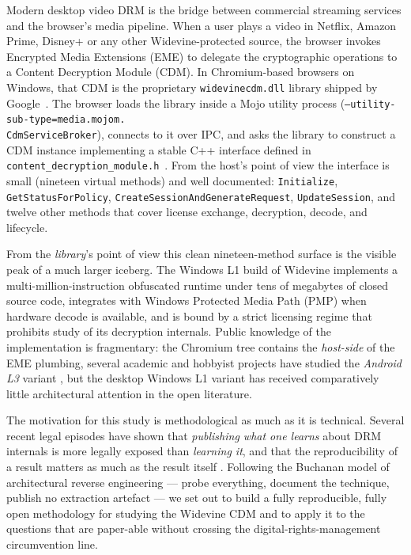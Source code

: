 \documentclass[11pt,letterpaper]{article}
\begin{document}
Modern desktop video DRM is the bridge between commercial streaming
services and the browser's media pipeline. When a user plays a video
in Netflix, Amazon Prime, Disney+ or any other Widevine-protected
source, the browser invokes Encrypted Media Extensions (EME) to
delegate the cryptographic operations to a Content Decryption Module
(CDM). In Chromium-based browsers on Windows, that CDM is the
proprietary \texttt{widevinecdm.dll} library shipped by
Google~\cite{widevine-spec}. The browser loads the library inside a
Mojo utility process
(\texttt{--utility-sub-type=media.mojom.\\CdmServiceBroker}), connects
to it over IPC, and asks the library to construct a CDM instance
implementing a stable C++ interface defined in
\texttt{content\_decryption\_module.h}~\cite{chromium-cdm-api}.
From the host's point of view the interface is small (nineteen
virtual methods) and well documented: \texttt{Initialize},
\texttt{GetStatusForPolicy}, \texttt{CreateSessionAndGenerateRequest},
\texttt{UpdateSession}, and twelve other methods that cover license
exchange, decryption, decode, and lifecycle.

From the \emph{library}'s point of view this clean nineteen-method
surface is the visible peak of a much larger iceberg. The Windows L1
build of Widevine implements a multi-million-instruction obfuscated
runtime under tens of megabytes of closed source code, integrates
with Windows Protected Media Path (PMP) when hardware decode is
available, and is bound by a strict licensing regime that prohibits
study of its decryption internals. Public knowledge of the
implementation is fragmentary: the Chromium tree contains the
\emph{host-side} of the EME plumbing, several academic and
hobbyist projects have studied the \emph{Android L3} variant
\cite{quarkslab-widevine, l3-decryptor}, but the desktop Windows
L1 variant has received comparatively little architectural attention
in the open literature.

The motivation for this study is methodological as much as it is
technical. Several recent legal episodes have shown that
\emph{publishing what one learns} about DRM internals is more legally
exposed than \emph{learning it}, and that the reproducibility of a
result matters as much as the result itself
\cite{sklyarov-case, dvdjon-norway, hadad-case}. Following the
Buchanan model of architectural reverse engineering \cite{buchanan-blog,
buchanan-imessage} --- probe everything, document the technique,
publish no extraction artefact --- we set out to build a fully
reproducible, fully open methodology for studying the Widevine CDM
and to apply it to the questions that are paper-able without
crossing the digital-rights-management circumvention line.
\end{document}
